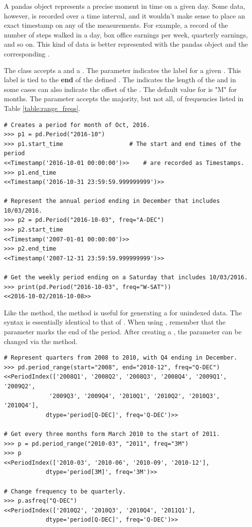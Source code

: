 A pandas  object represents a precise moment in time on a given day.
Some data, however, is recorded over a time interval, and it wouldn't make sense to place an exact timestamp on any of the measurements.
For example, a record of the number of steps walked in a day, box office earnings per week, quarterly earnings, and so on.
This kind of data is better represented with the pandas  object and the corresponding .

The  class accepts a  and a .
The  parameter indicates the label for a given .
This label is tied to the \textbf{end} of the defined .
The  indicates the length of the  and in some cases can also indicate the offset of the .
The default value for  is "M" for months.
The  parameter accepts the majority, but not all, of frequencies listed in Table \ref{table:range_freqs}.

\begin{lstlisting}
# Creates a period for month of Oct, 2016.
>>> p1 = pd.Period("2016-10")
>>> p1.start_time                   # The start and end times of the period
<<Timestamp('2016-10-01 00:00:00')>>    # are recorded as Timestamps.
>>> p1.end_time
<<Timestamp('2016-10-31 23:59:59.999999999')>>

# Represent the annual period ending in December that includes 10/03/2016.
>>> p2 = pd.Period("2016-10-03", freq="A-DEC")
>>> p2.start_time
<<Timestamp('2007-01-01 00:00:00')>>
>>> p2.end_time
<<Timestamp('2007-12-31 23:59:59.999999999')>>

# Get the weekly period ending on a Saturday that includes 10/03/2016.
>>> print(pd.Period("2016-10-03", freq="W-SAT"))
<<2016-10-02/2016-10-08>>
\end{lstlisting}

Like the  method, the  method is useful for generating a  for unindexed data.
The syntax is essentially identical to that of .
When using , remember that the  parameter marks the end of the period.
After creating a , the  parameter can be changed via the  method.

\begin{lstlisting}
# Represent quarters from 2008 to 2010, with Q4 ending in December.
>>> pd.period_range(start="2008", end="2010-12", freq="Q-DEC")
<<PeriodIndex(['2008Q1', '2008Q2', '2008Q3', '2008Q4', '2009Q1', '2009Q2',
             '2009Q3', '2009Q4', '2010Q1', '2010Q2', '2010Q3', '2010Q4'],
            dtype='period[Q-DEC]', freq='Q-DEC')>>

# Get every three months form March 2010 to the start of 2011.
>>> p = pd.period_range("2010-03", "2011", freq="3M")
>>> p
<<PeriodIndex(['2010-03', '2010-06', '2010-09', '2010-12'],
            dtype='period[3M]', freq='3M')>>

# Change frequency to be quarterly.
>>> p.asfreq("Q-DEC")
<<PeriodIndex(['2010Q2', '2010Q3', '2010Q4', '2011Q1'],
            dtype='period[Q-DEC]', freq='Q-DEC')>>
\end{lstlisting}

